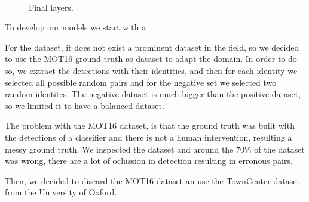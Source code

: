 \documentclass[12pt, a4paper, titlepage,twoside,openright]{article}
\begin{document}
\begin{itemize}
\begin{figure}[H]
\\



\caption{Final layers.}
\label{siameseData2}
\end{figure}

\end{itemize}

  

To develop our models we start with a 








For the dataset, it does not exist a prominent dataset in the field, so we decided to use the MOT16 ground truth as dataset to adapt the domain. In order to do so, we extract the detections with their identities, and then for each identity we selected all possible random pairs and for the negative set we selected two random identites. The negative dataset is much bigger than the positive dataset, so we limited it to have a balanced dataset. 

The problem with the MOT16 dataset, is that the ground truth was built with the detections of a classifier and there is not a human intervention, resulting a messy ground truth. We inspected the dataset and around the $70 \%$ of the dataset was wrong, there are a lot of oclussion in detection resulting in erronous pairs.

Then, we decided to discard the MOT16 dataset an use the TownCenter dataset \cite{townCenter} from the University of Oxford.
\end{document}
